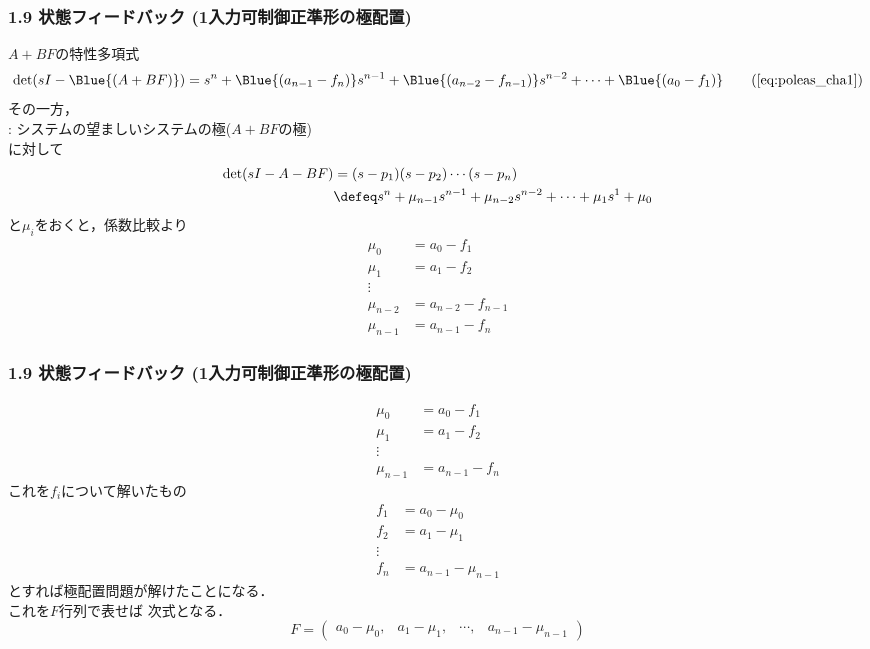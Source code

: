 \begin{frame}[t]
\frametitle{1.9 状態フィードバック (1入力可制御正準形の極配置)}
$A+BF$の特性多項式
\begin{equation}
 \det (sI-\Blue{(A+BF)}) = s^n + \Blue{(a_{n-1}-f_n)} s^{n-1}
  + \Blue{(a_{n-2}-f_{n-1})} s^{n-2} + \cdots 
  + \Blue{(a_0-f_1)}
\tag{\ref{eq:poleas_cha1}}
\end{equation}
その一方，\\
 : システムの望ましいシステムの極($A+BF$の極)\\
に対して
\begin{align}
 \det (s I - A - B F)
 &= (s - p_1)(s - p_2) \cdots (s - p_n) \nonumber \\
 &\defeq s^n + \mu_{n-1} s^{n-1} + \mu_{n-2} s^{n-2}
  + \cdots + \mu_1 s^1 + \mu_0
\label{eq:poleas_cha2}
\end{align}
と$\mu_i$をおくと，係数比較より
\begin{align}
 \mu_0 & = a_0-f_1    \nonumber\\
 \mu_{1} & = a_1-f_2  \nonumber\\
 \vdots \\
 \mu_{n-2} & = a_{n-2}-f_{n-1} \nonumber\\
 \mu_{n-1} & = a_{n-1}-f_n    \nonumber
\end{align}
\end{frame}


\begin{frame}[t]
\frametitle{1.9 状態フィードバック (1入力可制御正準形の極配置)}
\vspace*{-5mm}

\begin{align}
 \mu_0 & = a_0-f_1    \nonumber\\
 \mu_{1} & = a_1-f_2  \nonumber\\
 \vdots \\
 \mu_{n-1} & = a_{n-1}-f_n    \nonumber
\end{align}
これを$f_i$について解いたもの
\begin{align}
 f_1 & = a_0-\mu_0
\nonumber\\
 f_2 & = a_1-\mu_{1}
\nonumber\\
 \vdots
\nonumber\\
 f_n& = a_{n-1}-\mu_{n-1}
\nonumber
\end{align}
とすれば極配置問題が解けたことになる．\\
これを$F$行列で表せば
次式となる．
\begin{equation}
 {F} = \left(\begin{array}{cccc}
            a_0-\mu_0, & a_1-\mu_1, & \cdots, & a_{n-1}-\mu_{n-1}
     \end{array}\right)
\end{equation}

\end{frame}


